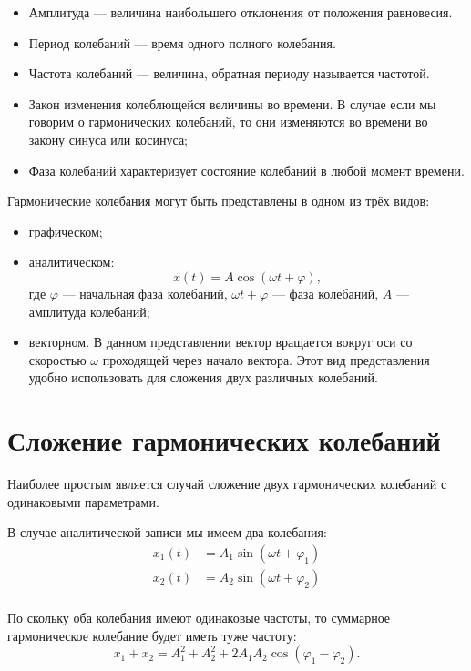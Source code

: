 \documentclass[10pt]{scrbook}
\begin{document}
\begin{itemize}
	\item Амплитуда --- величина наибольшего отклонения от положения равновесия.
	\item Период колебаний --- время одного полного колебания.
	\item Частота колебаний --- величина, обратная периоду называется частотой.
	\item Закон изменения колеблющейся величины во времени. В случае если мы
	      говорим о гармонических колебаний, то они изменяются во времени во закону
	      синуса или косинуса;
	\item Фаза колебаний характеризует состояние колебаний в любой момент
	      времени.
\end{itemize}

Гармонические колебания могут быть представлены в одном из трёх видов:
\begin{itemize}
	\item графическом;
	\item аналитическом: \[
		      x(t) = A \cos(\omega t + \varphi)
		      ,\] где $\varphi$ --- начальная фаза колебаний, $\omega t + \varphi$
	      --- фаза колебаний, $A$ --- амплитуда колебаний;
	\item векторном. В данном представлении вектор вращается вокруг оси со
	      скоростью $\omega$ проходящей через начало вектора. Этот вид представления
	      удобно использовать для сложения двух различных колебаний.
\end{itemize}

\section{Сложение гармонических колебаний}

Наиболее простым является случай сложение двух гармонических колебаний с
одинаковыми параметрами.

В случае аналитической записи мы имеем два колебания:
\begin{align*}
	x_1(t) & = A_1 \sin(\omega t + \varphi_1) \\
	x_2(t) & = A_2 \sin(\omega t + \varphi_2) \\
\end{align*}

По скольку оба колебания имеют одинаковые частоты, то суммарное гармоническое колебание будет иметь туже частоту: \[
	x_1 + x_2 = A_1^2 + A_2^2 + 2 A_1 A_2 \cos (\varphi_1 - \varphi_2)
	.\]
\end{document}
